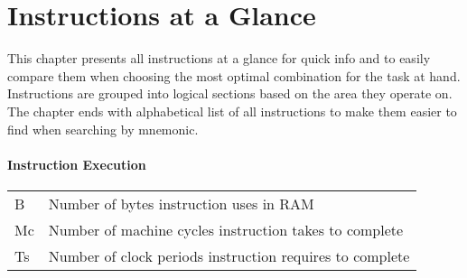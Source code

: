 \chapter{Instructions at a Glance}



\ChapterTOC[]

\pagebreak
\thispagestyle{plain} %

This chapter presents all instructions at a glance for quick info and to easily compare them when choosing the most optimal combination for the task at hand. Instructions are grouped into logical sections based on the area they operate on.
\ifdefined\isPDF \else The chapter ends with alphabetical list of all instructions to make them easier to find when searching by mnemonic. \fi

\subsubsection{Instruction Execution}

\begin{tabular}{ll}
	B & Number of bytes instruction uses in RAM\\
	Mc\notet & Number of machine cycles instruction takes to complete\\
	Ts\notet & Number of clock periods instruction requires to complete\\
\end{tabular}

